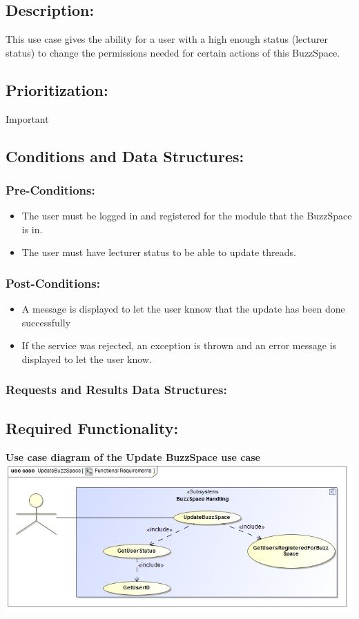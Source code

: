 \documentclass[a4paper,11pt]{article}
\begin{document}
\subsection*{Description:}This use case gives the ability for a user with a high enough status (lecturer status) to change the permissions needed for certain actions of this BuzzSpace. 
\subsection{Prioritization:} Important
\subsection{Conditions and Data Structures:}
\subsubsection*{Pre-Conditions:}
\begin{itemize}
	\item The user must be logged in and registered for the module that the BuzzSpace is in.
	\item The user must have lecturer status to be able to update threads.
\end{itemize}
\subsubsection*{Post-Conditions:}
\begin{itemize}
	\item A message is displayed to let the user knnow that the update has been done successfully
	\item If the service was rejected, an exception is thrown and an error message is displayed to let the user know.
\end{itemize}
\subsubsection*{Requests and Results Data Structures:}
\subsection{Required Functionality:} 
\textbf{Use case diagram of the Update BuzzSpace use case}\\
\includegraphics[width=1\linewidth]{./Images/BuzzSpaceHandling/buzzSpaceUpdate.jpg}\\
\end{document}
